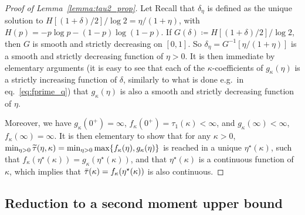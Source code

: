 \begin{proof}[Proof of Lemma~\ref{lemma:tau2_prop}]
Let 
Recall that $\delta_\eta$ is defined as the unique solution to $H[(1+\delta)/2]/\log 2 = \eta / (1+\eta)$, 
with $H(p) = -p \log p - (1-p) \log(1-p)$.
If $G(\delta) \coloneqq H[(1+\delta)/2]/\log 2$, then
$G$ is smooth and strictly decreasing on $[0,1]$. 
So $\delta_\eta = G^{-1}[\eta / (1+\eta)]$ is a smooth and strictly decreasing function of $\eta > 0$.
It is then immediate by elementary arguments (it is easy to see that each of the $\kappa$-coefficients of $g_\kappa(\eta)$ is a strictly increasing function of $\delta$, similarly to what is done e.g.\ in eq.~\eqref{eq:fprime_q}) that 
$g_\kappa(\eta)$ is also a smooth and strictly decreasing function of $\eta$.

\myskip
Moreover, we have $g_\kappa(0^+) = \infty$, $f_\kappa(0^+) = \tau_1(\kappa) < \infty$, and $g_\kappa(\infty) < \infty$, $f_\kappa(\infty) = \infty$.
It is then elementary to show that for any $\kappa > 0$, $\min_{\eta > 0} {\widetilde{\tau}}(\eta, \kappa) = \min_{\eta > 0} \max\{f_\kappa(\eta), g_\kappa(\eta)\}$ 
is reached in a unique $\eta^\star(\kappa)$, such that $f_\kappa(\eta^\star(\kappa)) = g_\kappa(\eta^\star(\kappa))$, and that 
$\eta^\star(\kappa)$ is a continuous function of $\kappa$, which implies that ${\bar{\tau}}(\kappa) = f_\kappa(\eta^\star(\kappa))$ is also continuous.
\end{proof}

\subsection{Reduction to a second moment upper bound}\label{subsec:reduction_2nd_moment_ub}

